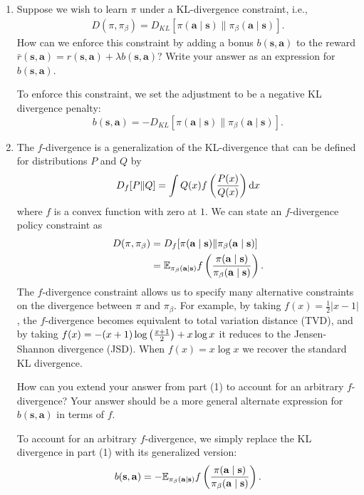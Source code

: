 \documentclass{article}
\def\s{\mathbf{s}}
\def\a{\mathbf{a}}
\def\E{\mathbb{E}}
\def\pib{\pi_{\beta}}
\begin{document}
\begin{enumerate}

	\item  Suppose we wish to learn $\pi$ under a KL-divergence constraint, i.e., 
	\begin{align*}
		D(\pi,\pib)=D_{KL}[\pi(\a\mid\s)\|\pib(\a\mid\s)].
	\end{align*}
	How can we enforce this constraint by adding a bonus $b(\s,\a)$ to the reward $\bar r(\s,\a)=r(\s,\a)+\lambda b(\s,\a)$? Write your answer as an expression for $b(\s,\a)$.
	
    \begin{sol}
        To enforce this constraint, we set the adjustment to be a negative KL divergence penalty:
        \[b(\s, \a) = -D_{KL}[\pi(\a\mid\s)\|\pib(\a\mid\s)].\]
    \end{sol}

	\item The $f$-divergence is a generalization of the KL-divergence that can be defined for distributions $P$ and $Q$ by $$D_f[P\|Q]=\int Q(x)f\left(P(x) \over Q(x)\right)\mathrm dx$$ where $f$ is a convex function with zero at $1$. We can state an $f$-divergence policy constraint as 
	\begin{align*}
	    D(\pi,\pib)&=D_{f}[\pi(\a\mid\s)\|\pib(\a\mid\s)]\\
	    &= \E_{\pib(\a\mid\s)}f\left(\pi(\a\mid\s)\over\pib(\a\mid\s)\right).
   	\end{align*}
   	The $f$-divergence constraint allows us to specify many alternative constraints on the divergence between $\pi$ and $\pib$. For example, by taking $f(x)=\frac12|x-1|$, the $f$-divergence becomes equivalent to total variation distance (TVD), and by taking $f(x)=-(x+1)\log\left(x+1\over2\right)+x\log x$ it reduces to the Jensen-Shannon divergence (JSD). When $f(x)=x\log x$ we recover the standard KL divergence.
   	
   	How can you extend your answer from part (1) to account for an arbitrary $f$-divergence? Your answer should be a more general alternate expression for $b(\s,\a)$ in terms of $f$.
	
    \begin{sol}
        To account for an arbitrary $f$-divergence, we simply replace the KL divergence in part (1) with its generalized version:
        \[b(\s, \a) = -\E_{\pib(\a\mid\s)}f\left(\pi(\a\mid\s)\over\pib(\a\mid\s)\right).\]
    \end{sol}


\end{enumerate}
\end{document}
